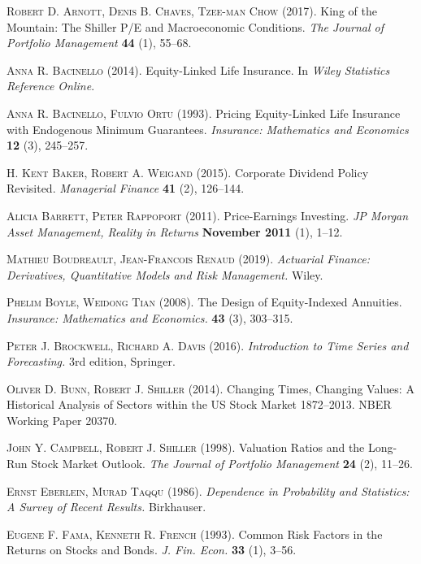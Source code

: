 \documentclass[12pt]{amsart}
\theoremstyle{definition}
\begin{document}
\begin{thebibliography}{99}

 \textsc{Robert D. Arnott, Denis B. Chaves, Tzee-man Chow} (2017). King of the Mountain: The Shiller P/E and Macroeconomic Conditions. \textit{The Journal of Portfolio Management} \textbf{44} (1), 55--68.

 \textsc{Anna R. Bacinello} (2014). Equity-Linked Life Insurance. In \textit{Wiley Statistics Reference Online}.

 \textsc{Anna R. Bacinello, Fulvio Ortu} (1993). Pricing Equity-Linked Life Insurance with Endogenous Minimum Guarantees. \textit{Insurance: Mathematics and Economics} \textbf{12} (3), 245--257. 

 \textsc{H. Kent Baker, Robert A. Weigand} (2015). Corporate Dividend Policy Revisited. \textit{Managerial Finance} \textbf{41} (2), 126--144. 

 \textsc{Alicia Barrett, Peter Rappoport} (2011). Price-Earnings Investing. \textit{JP Morgan Asset Management, Reality in Returns} \textbf{November 2011} (1), 1--12.

 \textsc{Mathieu Boudreault, Jean-Francois Renaud} (2019). \textit{Actuarial Finance: Derivatives, Quantitative Models and Risk Management.} Wiley. 

 \textsc{Phelim Boyle, Weidong Tian} (2008). The Design of Equity-Indexed Annuities. \textit{Insurance: Mathematics and Economics.} \textbf{43} (3), 303--315. 

 \textsc{Peter J. Brockwell, Richard A. Davis} (2016). \textit{Introduction to Time Series and Forecasting.} 3rd edition, Springer.

 \textsc{Oliver D. Bunn, Robert J. Shiller} (2014). Changing Times, Changing Values: A Historical Analysis of Sectors within the US Stock Market 1872--2013. NBER Working Paper 20370.

 \textsc{John Y. Campbell, Robert J. Shiller} (1998). Valuation Ratios and the Long-Run Stock Market Outlook. \textit{The Journal of Portfolio Management} \textbf{24} (2), 11--26.

 \textsc{Ernst Eberlein, Murad Taqqu} (1986). \textit{Dependence in Probability and Statistics: A Survey of Recent Results.} Birkhauser. 

 \textsc{Eugene F. Fama, Kenneth R. French} (1993). Common Risk Factors in the Returns on Stocks and Bonds. \textit{J. Fin. Econ.} \textbf{33} (1), 3--56.


\end{thebibliography}
\end{document}
